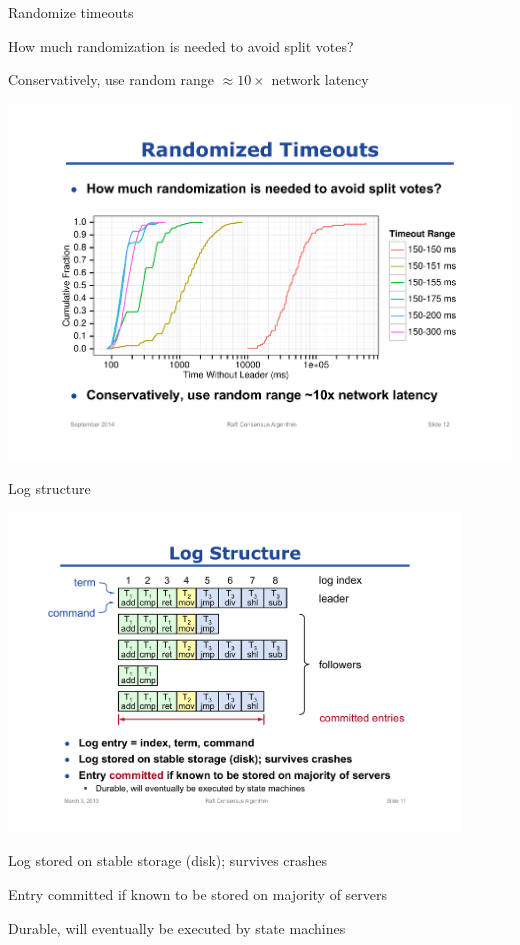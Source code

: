 \begin{frame}{Randomize timeouts}
\BI
\item How much randomization is needed to avoid split votes?
\item Conservatively, use random range $\approx 10\times$ network latency
\EI

\begin{center}
\includegraphics[width=1.0\textwidth]{randomization}
\end{center}

\end{frame}

\begin{frame}{Log structure}

\begin{center}
\includegraphics[width=0.9\textwidth]{log}
\end{center}

\BI
\item Log stored on stable storage (disk); survives crashes
\item Entry \alert{committed} if \alert{known} to be stored on majority of servers
\item Durable, will eventually be executed by state machines
\EI
	
\end{frame}

